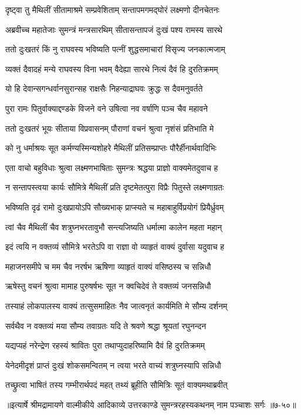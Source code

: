 
\twolineshloka
{दृष्ट्वा तु मैथिलीं सीतामाश्रमे सम्प्रवेशिताम्}
{सन्तापमगमद्घोरं लक्ष्मणो दीनचेतनः} %

\twolineshloka
{अब्रवीच्च महातेजाः सुमन्त्रं मन्त्रसारथिम्}
{सीतासन्तापजं दुःखं पश्य रामस्य सारथे} %

\twolineshloka
{ततो दुःखतरं किं नु राघवस्य भविष्यति}
{पत्नीं शुद्धसमाचारां विसृज्य जनकात्मजाम्} %

\twolineshloka
{व्यक्तं दैवादहं मन्ये राघवस्य विना भवम्}
{वैदेह्या सारथे नित्यं दैवं हि दुरतिक्रमम्} %

\twolineshloka
{यो हि देवान्सगन्धर्वानसुरान्सह राक्षसैः}
{निहन्याद्राघवः क्रुद्धः स दैवमनुवर्तते} %

\twolineshloka
{पुरा रामः पितुर्वाक्याद्दण्डके विजने वने}
{उषित्वा नव वर्षाणि पञ्च चैव महावने} %

\twolineshloka
{ततो दुःखतरं भूयः सीताया विप्रवासनम्}
{पौराणां वचनं श्रुत्वा नृशंसं प्रतिभाति मे} %

\twolineshloka
{को नु धर्माश्रयः सूत कर्मण्यस्मिन्यशोहरे}
{मैथिलीं प्रतिसम्प्राप्तः पौरैर्हीनार्थवादिभिः} %

\twolineshloka
{एता वाचो बहुविधाः श्रुत्वा लक्ष्मणभाषिताः}
{सुमन्त्रः श्रद्धया प्राज्ञो वाक्यमेतदुवाच ह} %

\twolineshloka
{न सन्तापस्त्वया कार्यः सौमित्रे मैथिलीं प्रति}
{दृष्टमेतत्पुरा विप्रैः पितुस्ते लक्ष्मणाग्रतः} %

\twolineshloka
{भविष्यति दृढं रामो दुःखप्रायोऽपि सौख्यभाक्}
{प्राप्स्यते च महाबाहुर्विप्रयोगं प्रियैर्ध्रुवम्} %

\twolineshloka
{त्वां चैव मैथिलीं चैव शत्रुघ्नभरतावुभौ}
{सन्त्यजिष्यति धर्मात्मा कालेन महता महान्} %

\twolineshloka
{इदं त्वयि न वक्तव्यं सौमित्रे भरतेऽपि वा}
{राज्ञा वो व्याहृतं वाक्यं दुर्वासा यदुवाच ह} %

\twolineshloka
{महाजनसमीपे च मम चैव नरर्षभ}
{ऋषिणा व्याहृतं वाक्यं वसिष्ठस्य च सन्निधौ} %

\twolineshloka
{ऋषेस्तु वचनं श्रुत्वा मामाह पुरुषर्षभः}
{सूत न क्वचिदेवं ते वक्तव्यं जनसन्निधौ} %

\twolineshloka
{तस्याहं लोकपालस्य वाक्यं तत्सुसमाहितः}
{नैव जात्वनृतं कार्यमिति मे सौम्य दर्शनम्} %

\twolineshloka
{सर्वथैव न वक्तव्यं मया सौम्य तवाग्रतः}
{यदि ते श्रवणे श्रद्धा श्रूयतां रघुनन्दन} %

\twolineshloka
{यद्यप्यहं नरेन्द्रेण रहस्यं श्रावितः पुरा}
{तथाप्युदाहरिष्यामि दैवं हि दुरतिक्रमम्} %

\twolineshloka
{येनेदमीदृशं प्राप्तं दुःखं शोकसमन्वितम्}
{न त्वया भरते वाच्यं शत्रुघ्नस्यापि सन्निधौ} %

\twolineshloka
{तच्छ्रुत्वा भाषितं तस्य गम्भीरार्थपदं महत्}
{तथ्यं ब्रूहीति सौमित्रिः सूतं वाक्यमथाब्रवीत्} %


॥इत्यार्षे श्रीमद्रामायणे वाल्मीकीये आदिकाव्ये उत्तरकाण्डे सुमन्त्ररहस्यकथनम् नाम पञ्चाशः सर्गः ॥७-५०॥
